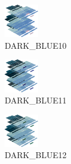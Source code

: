 \hspace{0.1cm}
\begin{minipage}[b]{0.15\linewidth}
\begin{figure}[H]                                                          
  \centering                                                             
  \begin{adjustbox}{width=1.5cm,center}                                   
  \includegraphics[width=1.5cm]{src/colorspace_colourflow/flows/colourflow_154-45.png}%
  \end{adjustbox}                                                        
\caption*{DARK\_BLUE10}                                           
\end{figure}                                                               
\end{minipage}
\hspace{0.1cm}
\begin{minipage}[b]{0.15\linewidth}
\begin{figure}[H]                                                          
  \centering                                                             
  \begin{adjustbox}{width=1.5cm,center}                                   
  \includegraphics[width=1.5cm]{src/colorspace_colourflow/flows/colourflow_155-45.png}%
  \end{adjustbox}                                                        
\caption*{DARK\_BLUE11}                                           
\end{figure}                                                               
\end{minipage}
\hspace{0.1cm}
\begin{minipage}[b]{0.15\linewidth}
\begin{figure}[H]                                                          
  \centering                                                             
  \begin{adjustbox}{width=1.5cm,center}                                   
  \includegraphics[width=1.5cm]{src/colorspace_colourflow/flows/colourflow_156-45.png}%
  \end{adjustbox}                                                        
\caption*{DARK\_BLUE12}                                           
\end{figure}                                                               
\end{minipage}
